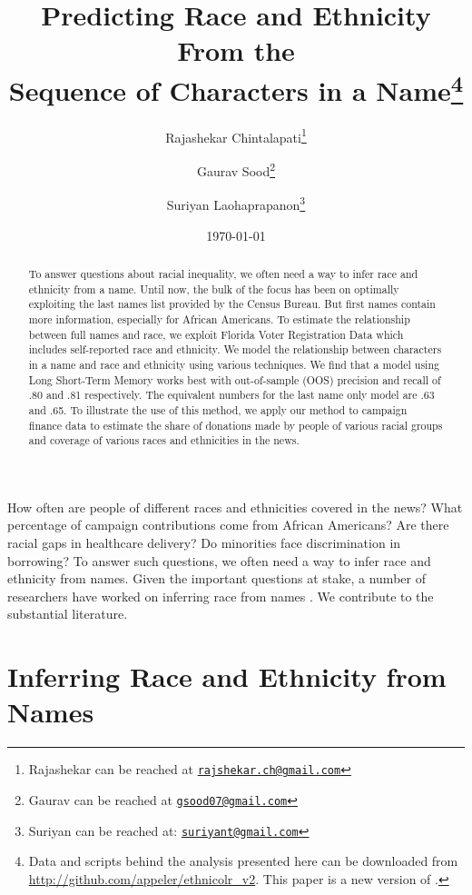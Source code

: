 \documentclass[12pt, letterpaper]{article}
\title{\Large{Predicting Race and Ethnicity From the\\Sequence of Characters in a Name}\footnote{Data and scripts behind the analysis presented here can be downloaded from \url{http://github.com/appeler/ethnicolr_v2}. This paper is a new version of \citet{sood2018predicting}.}}
\author{Rajashekar Chintalapati\thanks{Rajashekar can be reached at \href{mailto:rajshekar.ch@gmail.com}\texttt{rajshekar.ch@gmail.com}} \and Gaurav Sood\thanks{Gaurav can be reached at \href{mailto:gsood07@gmail.com}\texttt{gsood07@gmail.com}}
\and Suriyan Laohaprapanon\thanks{Suriyan can be reached at: \href{mailto:suriyant@gmail.com}\texttt{suriyant@gmail.com}}}
\date{\vspace{.5cm}\normalsize{\today}}
\begin{document}
\maketitle

\begin{abstract}
To answer questions about racial inequality, we often need a way to infer race and ethnicity from a name. Until now, the bulk of the focus has been on optimally exploiting the last names list provided by the Census Bureau. But first names contain more information, especially for African Americans. To estimate the relationship between full names and race, we exploit Florida Voter Registration Data which includes self-reported race and ethnicity. We model the relationship between characters in a name and race and ethnicity using various techniques. We find that a model using Long Short-Term Memory works best with out-of-sample (OOS) precision and recall of .80 and .81 respectively. The equivalent numbers for the last name only model are .63 and .65. To illustrate the use of this method, we apply our method to campaign finance data to estimate the share of donations made by people of various racial groups and coverage of various races and ethnicities in the news.
\end{abstract}
\clearpage
\doublespace

How often are people of different races and ethnicities covered in the news? What percentage of campaign contributions come from African Americans? Are there racial gaps in healthcare delivery? Do minorities face discrimination in borrowing? To answer such questions, we often need a way to infer race and ethnicity from names. Given the important questions at stake, a number of researchers have worked on inferring race from names \citep[see, e.g.,][]{ambekar2009name, fiscella2006use, imai2016improving, rosenman2022race}. We contribute to the substantial literature.

\section*{Inferring Race and Ethnicity from Names}
\end{document}
